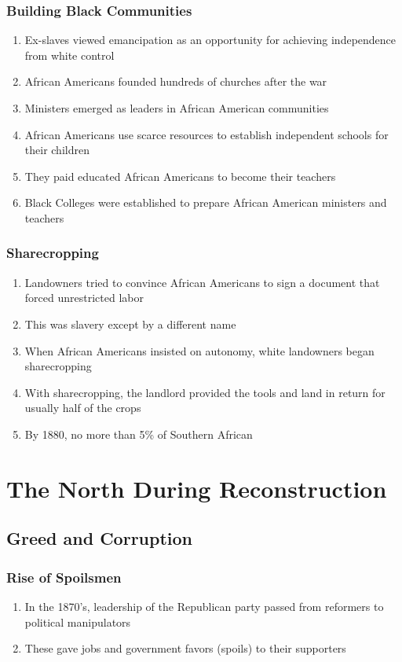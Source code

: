 \documentclass[12pt]{article} %
\begin{document}
\subsubsection{Building Black Communities}
\begin{enumerate}
	\item Ex-slaves viewed emancipation as an opportunity for achieving independence from white 
		control 
	\item African Americans founded hundreds of churches after the war
	\item Ministers emerged as leaders in African American communities
	\item African Americans use scarce resources to establish independent schools for their children
	\item They paid educated African Americans to become their teachers
	\item Black Colleges were established to prepare African American ministers and teachers
\end{enumerate}
\subsubsection{Sharecropping}
\begin{enumerate}
	\item Landowners tried to convince African Americans to sign a document that forced unrestricted
		labor 
	\item This was slavery except by a different name
	\item When African Americans insisted on autonomy, white landowners began sharecropping
	\item With sharecropping, the landlord provided the tools and land in return for usually half of
		the crops
	\item By 1880, no more than 5\% of Southern African
\end{enumerate}

\section{The North During Reconstruction}
\subsection{Greed and Corruption}
\subsubsection{Rise of Spoilsmen}
\begin{enumerate}
	\item In the 1870's, leadership of the Republican party passed from reformers to political
		manipulators
	\item These gave jobs and government favors (spoils) to their supporters
\end{enumerate}
\end{document}
